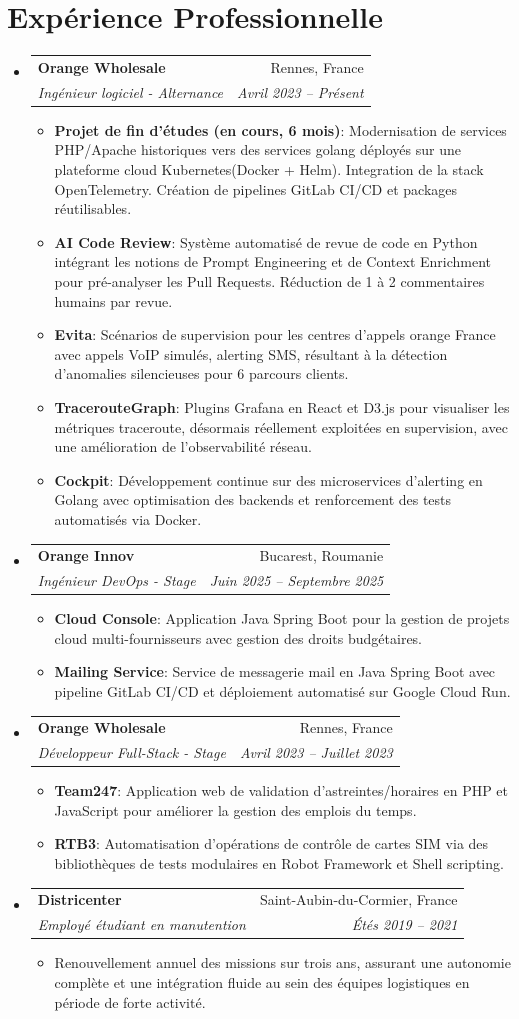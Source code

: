 \documentclass[letterpaper,11pt]{article}
\makeatletter
\newcommand{\resumeItem}[2]{
  \item\small{
    \begin{minipage}[t]{\dimexpr\linewidth-2em\relax}
    \textbf{#1}{: #2 \vspace{-2pt}}
    \end{minipage}
  }
}
\newcommand{\resumeItemPlain}[1]{
  \item\small{
    {#1 \vspace{-2pt}}
  }
}
\newcommand{\resumeSubheading}[4]{
  \vspace{-1pt}\item
    \begin{tabular*}{0.97\textwidth}[t]{l@{\extracolsep{\fill}}r}
      \textbf{#1} & #2 \\
      \textit{\small #3} & \textit{\small #4} \\
    \end{tabular*}\vspace{-6pt}
}
\newcommand{\resumeSubHeadingListStart}{\begin{itemize}[leftmargin=*]}
\newcommand{\resumeSubHeadingListEnd}{\end{itemize}}
\newcommand{\resumeItemListStart}{\begin{itemize}}
\newcommand{\resumeItemListEnd}{\end{itemize}\vspace{-6pt}}
\makeatother
\begin{document}
\section{Expérience Professionnelle}
  \resumeSubHeadingListStart
    \resumeSubheading
      {Orange Wholesale}{Rennes, France}
      {Ingénieur logiciel - Alternance}{Avril 2023 -- Présent}
      \resumeItemListStart
        \resumeItem{Projet de fin d'études (en cours, 6 mois)}{Modernisation de services PHP/Apache historiques vers des services golang déployés sur une plateforme cloud Kubernetes(Docker + Helm). Integration de la stack OpenTelemetry. Création de pipelines GitLab CI/CD et packages réutilisables.}
        \resumeItem{AI Code Review}{Système automatisé de revue de code en Python intégrant les notions de Prompt Engineering et de Context Enrichment pour pré-analyser les Pull Requests. Réduction de 1 à 2 commentaires humains par revue.}
        \resumeItem{Evita}{Scénarios de supervision pour les centres d'appels orange France avec appels VoIP simulés, alerting SMS, résultant à la détection d'anomalies silencieuses pour 6 parcours clients.}
        \resumeItem{TracerouteGraph}{Plugins Grafana en React et D3.js pour visualiser les métriques traceroute, désormais réellement exploitées en supervision, avec une amélioration de l'observabilité réseau.}
        \resumeItem{Cockpit}{Développement continue sur des microservices d'alerting en Golang avec optimisation des backends et renforcement des tests automatisés via Docker.}
      \resumeItemListEnd
    \resumeSubheading
      {Orange Innov}{Bucarest, Roumanie}
      {Ingénieur DevOps - Stage}{Juin 2025 -- Septembre 2025}
      \resumeItemListStart
        \resumeItem{Cloud Console}{Application Java Spring Boot pour la gestion de projets cloud multi-fournisseurs avec gestion des droits budgétaires.}
        \resumeItem{Mailing Service}{Service de messagerie mail en Java Spring Boot avec pipeline GitLab CI/CD et déploiement automatisé sur Google Cloud Run.}
    \resumeItemListEnd
        \resumeSubheading
      {Orange Wholesale}{Rennes, France}
      {Développeur Full-Stack - Stage}{Avril 2023 -- Juillet 2023}
      \resumeItemListStart
        \resumeItem{Team247}{Application web de validation d'astreintes/horaires en PHP et JavaScript pour améliorer la gestion des emplois du temps.}
        \resumeItem{RTB3}{Automatisation d'opérations de contrôle de cartes SIM via des bibliothèques de tests modulaires en Robot Framework et Shell scripting.}
      \resumeItemListEnd
    \resumeSubheading
      {Districenter}{Saint-Aubin-du-Cormier, France}
      {Employé étudiant en manutention}{Étés 2019 -- 2021}
      \resumeItemListStart
        \resumeItemPlain{Renouvellement annuel des missions sur trois ans, assurant une autonomie complète et une intégration fluide au sein des équipes logistiques en période de forte activité.}
      \resumeItemListEnd
  \resumeSubHeadingListEnd
\end{document}
